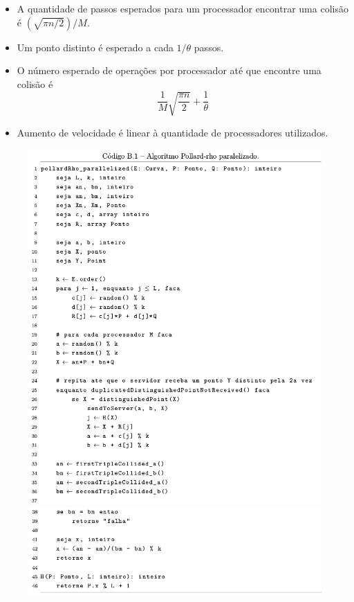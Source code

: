 \documentclass{beamer}
\begin{document}
\begin{frame}
  \begin{itemize}
    \item A quantidade de passos esperados para um processador encontrar uma colisão é $(\sqrt{\pi n/2})/M$.
    \item Um ponto distinto é esperado a cada $1/\theta$ passos.
    \item O número esperado de operações por processador até que encontre uma colisão é
    $$
      \frac{1}{M}\sqrt{\frac{\pi n}{2}} + \frac{1}{\theta}
    $$
    \item Aumento de velocidade é linear à quantidade de processadores utilizados.
  \end{itemize}
\end{frame}
\begin{frame}
  \begin{figure}[h]
    \centering
    \includegraphics[scale=0.22]{paralelizado_1}

    \includegraphics[scale=0.22]{paralelizado_2}
  \end{figure}
\end{frame}
\end{document}
